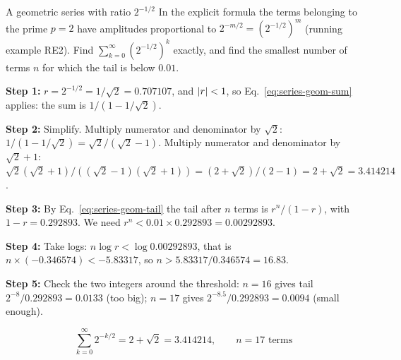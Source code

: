 \begin{sample}{A geometric series with ratio $2^{-1/2}$}
In the explicit formula the terms belonging to the prime $p=2$ have amplitudes proportional to $2^{-m/2}=(2^{-1/2})^m$ (running example RE2). Find $\sum_{k=0}^\infty(2^{-1/2})^k$ exactly, and find the smallest number of terms $n$ for which the tail is below $0.01$.

\textbf{Step 1:} $r=2^{-1/2}=1/\sqrt2=0.707107$, and $\left\lvert r\right\rvert<1$, so Eq.~\eqref{eq:series-geom-sum} applies: the sum is $1/(1-1/\sqrt2)$.

\textbf{Step 2:} Simplify. Multiply numerator and denominator by $\sqrt2$: $1/(1-1/\sqrt2)=\sqrt2/(\sqrt2-1)$. Multiply numerator and denominator by $\sqrt2+1$: $\sqrt2(\sqrt2+1)/((\sqrt2-1)(\sqrt2+1))=(2+\sqrt2)/(2-1)=2+\sqrt2=3.414214$.

\textbf{Step 3:} By Eq.~\eqref{eq:series-geom-tail} the tail after $n$ terms is $r^n/(1-r)$, with $1-r=0.292893$. We need $r^n<0.01\times0.292893=0.00292893$.

\textbf{Step 4:} Take logs: $n\log r<\log 0.00292893$, that is $n\times(-0.346574)<-5.83317$, so $n>5.83317/0.346574=16.83$.

\textbf{Step 5:} Check the two integers around the threshold: $n=16$ gives tail $2^{-8}/0.292893=0.0133$ (too big); $n=17$ gives $2^{-8.5}/0.292893=0.0094$ (small enough).

\[\boxed{\sum_{k=0}^\infty 2^{-k/2}=2+\sqrt2=3.414214,\qquad n=17 \text{ terms}}\]
\end{sample}

